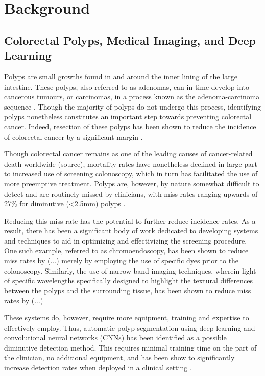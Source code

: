 \chapter{Background} \label{background}
\setcounter{chapter}{2}
\section{Colorectal Polyps, Medical Imaging, and Deep Learning}
	Polyps are small growths found in and around the inner lining of the large intestine. These polyps, also referred to as adenomas, can in time develop into cancerous tumours, or carcinomas, in a process known as the adenoma-carcinoma sequence \cite{ACS}. Though the majority of polyps do not undergo this process, identifying polyps nonetheless constitutes an important step towards preventing colorectal cancer. Indeed, resection of these polyps has been shown to reduce the incidence of colorectal cancer by a significant margin \cite{resection}. 
	
	Though colorectal cancer remains as one of the leading causes of cancer-related death worldwide (source), mortality rates have nonetheless declined in large part to increased use of screening colonoscopy, which in turn has facilitated the use of more preemptive treatment. Polyps are, however, by nature somewhat difficult to detect and are routinely missed by clinicians, with miss rates ranging upwards of 27\% for diminutive (<2.5mm) polyps  \cite{missrate1, missrate2}.
	
	Reducing this miss rate has the potential to further reduce incidence rates. As a result, there has been a significant body of work dedicated to developing systems and techniques to aid in optimizing and effectivizing the screening procedure. One such example, referred to as chromoendoscopy, has been shown to reduce miss rates by (...) merely by employing the use of specific dyes prior to the colonoscopy. Similarly, the use of narrow-band imaging techniques, wherein light of specific wavelengths specifically designed to highlight the textural differences between the polyps and the surrounding tissue, has been shown to reduce miss rates by (...) 
	
	These systems do, however, require more equipment, training and expertise to effectively employ. Thus, automatic polyp segmentation using deep learning and convolutional neural networks (CNNs) has been identified as a possible diminutive detection method. This requires minimal training time on the part of the clinician, no additional equipment, and has been show to significantly increase detection rates when deployed in a clinical setting \cite{polyp-success-story}. 

